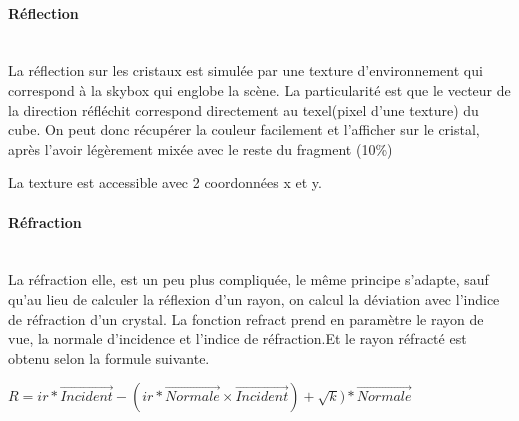 \documentclass[pdftex, 11pt, a4paper, titlepage]{article}
\newcommand{\vect}[1]{\overrightarrow{#1}}
\begin{document}
\paragraph{Réflection}\mbox{}\\
La réflection sur les cristaux est simulée par une texture d'environnement 
qui correspond à la skybox qui englobe la scène.
La particularité est que le vecteur de la direction réfléchit correspond 
directement au texel(pixel d'une texture) du cube. On peut donc récupérer
 la couleur facilement et l'afficher sur le cristal, après
l'avoir légèrement mixée avec le reste du fragment (10\%)

La texture est accessible avec 2 coordonnées x et y.

\paragraph{Réfraction}\mbox{}\\
La réfraction elle, est un peu plus compliquée, le même principe s'adapte, 
sauf qu'au lieu de calculer la réflexion d'un rayon, on calcul la 
déviation avec l'indice de réfraction d'un crystal. La fonction refract
 prend en paramètre le rayon de vue, la normale d'incidence et
 l'indice de réfraction.Et le rayon réfracté est obtenu selon la
 formule suivante.

\begin{math}
R = ir * \vect{Incident} - (ir * \vect{Normale} \times \vect{Incident}) + \sqrt{k}) * \vect{Normale}
\end{math}
\end{document}
